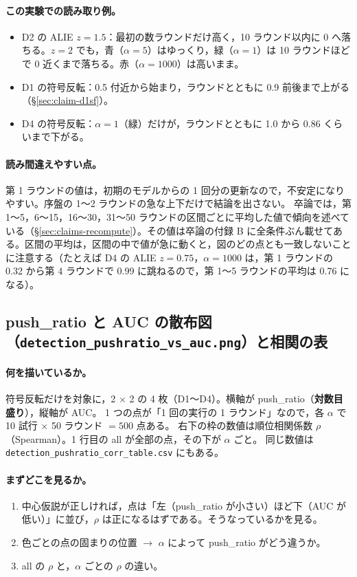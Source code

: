\documentclass[a4j, dvipdfmx]{jsarticle}  %
\begin{document}
\paragraph{この実験での読み取り例。}
\begin{itemize}
  \item D2 の ALIE $z = 1.5$：最初の数ラウンドだけ高く，10 ラウンド以内に 0 へ落ちる。$z = 2$ でも，青（$\alpha = 5$）はゆっくり，緑（$\alpha = 1$）は 10 ラウンドほどで 0 近くまで落ちる。赤（$\alpha = 1000$）は高いまま。
  \item D1 の符号反転：0.5 付近から始まり，ラウンドとともに 0.9 前後まで上がる（\S\ref{sec:claim-d1sf}）。
  \item D4 の符号反転：$\alpha = 1$（緑）だけが，ラウンドとともに 1.0 から 0.86 くらいまで下がる。
\end{itemize}

\paragraph{読み間違えやすい点。}
第 1 ラウンドの値は，初期のモデルからの 1 回分の更新なので，不安定になりやすい。序盤の 1〜2 ラウンドの急な上下だけで結論を出さない。
卒論では，第 1〜5，6〜15，16〜30，31〜50 ラウンドの区間ごとに平均した値で傾向を述べている（\S\ref{sec:claims-recompute}）。その値は卒論の付録 B に全条件ぶん載せてある。区間の平均は，区間の中で値が急に動くと，図のどの点とも一致しないことに注意する（たとえば D4 の ALIE $z = 0.75$，$\alpha = 1000$ は，第 1 ラウンドの 0.32 から第 4 ラウンドで 0.99 に跳ねるので，第 1〜5 ラウンドの平均は 0.76 になる）。

\subsection{push\_ratio と AUC の散布図（\texttt{detection\_pushratio\_vs\_auc.png}）と相関の表}

\paragraph{何を描いているか。}
符号反転だけを対象に，2 $\times$ 2 の 4 枚（D1〜D4）。横軸が push\_ratio（\textbf{対数目盛り}），縦軸が AUC。
1 つの点が「1 回の実行の 1 ラウンド」なので，各 $\alpha$ で 10 試行 $\times$ 50 ラウンド $= 500$ 点ある。
右下の枠の数値は順位相関係数 $\rho$（Spearman）。1 行目の all が全部の点，その下が $\alpha$ ごと。
同じ数値は \texttt{detection\_pushratio\_corr\_table.csv} にもある。

\paragraph{まずどこを見るか。}
\begin{enumerate}
  \item 中心仮説が正しければ，点は「左（push\_ratio が小さい）ほど下（AUC が低い）」に並び，$\rho$ は正になるはずである。そうなっているかを見る。
  \item 色ごとの点の固まりの位置 $\rightarrow$ $\alpha$ によって push\_ratio がどう違うか。
  \item all の $\rho$ と，$\alpha$ ごとの $\rho$ の違い。
\end{enumerate}
\end{document}
